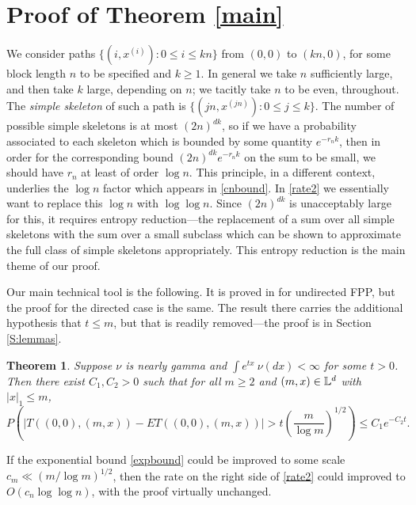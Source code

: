 \documentclass[12pt]{amsart}
\theoremstyle{plain}
\newtheorem{theorem}[lemma]{Theorem}
\theoremstyle{definition}
\numberwithin{equation}{section}
\begin{document}
\section{Proof of Theorem \ref{main}} \label{S:proof}
We consider paths $\{(i,x^{(i)}):0\leq i \leq kn\}$ from $(0,0)$ to $(kn,0)$, for some block length $n$ to be specified and $k \geq 1$.  In general we take $n$ sufficiently large, and then take $k$ large, depending on $n$; we tacitly take $n$ to be even, throughout.  The \emph{simple skeleton} of such a path is $\{(jn,x^{(jn)}):0 \leq j \leq k\}$.  The number of possible simple skeletons is at most $(2n)^{dk}$, so if we have a probability associated to each skeleton which is bounded by some quantity $e^{-r_nk}$, then in order for the corresponding bound $(2n)^{dk}e^{-r_nk}$ on the sum to be small, 
we should have $r_n$ at least of order $\log n$.  This principle, in a different context, underlies the $\log n$ factor which appears in \eqref{cnbound}.  In \eqref{rate2} we essentially want to replace this $\log n$ with $\log \log n$.  Since $(2n)^{dk}$ is unacceptably large for this, it requires entropy reduction---the replacement of a sum over all simple skeletons with the sum over a small subclass which can be shown to approximate the full class of simple skeletons appropriately.  This entropy reduction is the main theme of our proof.

Our main technical tool is the following.  It is proved in \cite{BR08} for undirected FPP, but the proof for the directed case is the same.  The result there carries the additional hypothesis that $t \leq m$, but that is readily removed---the proof is in Section \ref{S:lemmas}.

\begin{theorem} \label{BR} 
  Suppose $\nu$ is nearly gamma and $\int e^{tx}\ \nu(dx) < \infty$ for some $t>0$.  Then there exist $C_1,C_2>0$ such that for 
  all $m \geq 2$ and $(m,x) \in \mathbb{L}^d$ with $|x|_1 \leq m$,
  \begin{equation} \label{expbound}
  P\left( \big|T((0,0),(m,x)) - ET((0,0),(m,x)) \big| > t\left(\frac{m}{\log m} \right)^{1/2} \right) \leq C_1 e^{-C_2t}.
  \end{equation}
\end{theorem}

If the exponential bound \eqref{expbound} could be improved to some scale $c_m \ll (m/\log m)^{1/2}$, then the rate on the right side of \eqref{rate2} could improved to $O(c_n\log\log n)$, with the proof virtually unchanged.
\end{document}
